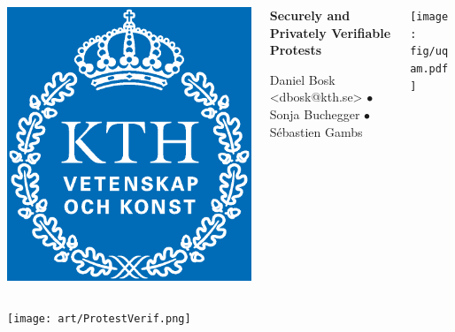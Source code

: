 \begin{columns}
  \begin{column}{0.17\linewidth}
    \includegraphics[width=0.5\linewidth]{fig/kth_cmyk.eps}
    \hfill
  \end{column}
  \hfill
  \begin{column}{0.64\linewidth}
    \begin{center}
      \Huge\bfseries
      Securely and Privately Verifiable Protests
    \end{center}
    \begin{center}
      \large
      Daniel Bosk <dbosk@kth.se>
      $\bullet$
      Sonja Buchegger
      $\bullet$
      Sébastien Gambs
    \end{center}
    \vspace{1.5em}
  \end{column}
  \hfill
  \begin{column}{0.17\linewidth}
    \hfill
    \texttt{[image: fig/uqam.pdf]}
  \end{column}
\end{columns}

\texttt{[image: art/ProtestVerif.png]}

